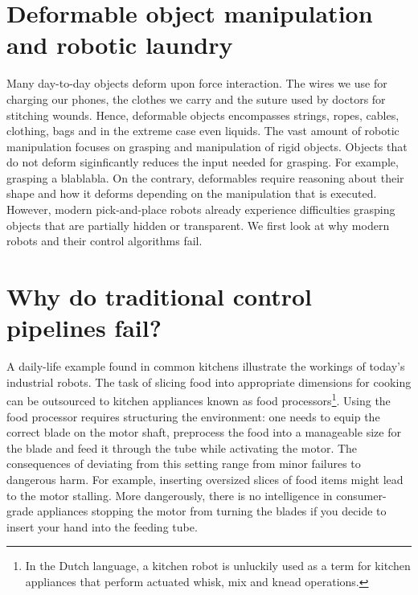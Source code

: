 \documentclass[\home/main.tex]{subfiles}
\begin{document}
\section{Deformable object manipulation and robotic laundry}
Many day-to-day objects deform upon force interaction. The wires we use for charging our phones, the clothes we carry and the suture used by doctors for stitching wounds. Hence, deformable objects encompasses strings, ropes, cables, clothing, bags and in the extreme case even liquids.  
The vast amount of robotic manipulation focuses on grasping and manipulation of rigid objects. Objects that do not deform siginficantly reduces the input needed for grasping. For example, grasping a blablabla.
On the contrary, deformables require reasoning about their shape and how it deforms depending on the manipulation that is executed.  
However, modern pick-and-place robots already experience difficulties grasping objects that are partially hidden or transparent. We first look at why modern robots and their control algorithms fail. 

\section{Why do traditional control pipelines fail?}
A daily-life example found in common kitchens illustrate the workings of today's industrial robots. The task of slicing food into appropriate dimensions for cooking can be outsourced to kitchen appliances known as food processors\footnote{In the Dutch language, a kitchen robot is unluckily used as a term for kitchen appliances that perform actuated whisk, mix and knead operations.}. Using the food processor requires structuring the environment: one needs to equip the correct blade on the motor shaft, preprocess the food into a manageable size for the blade and feed it through the tube while activating the motor. The consequences of deviating from this setting range from minor failures to dangerous harm. For example, inserting oversized slices of food items might lead to the motor stalling. More dangerously, there is no intelligence in consumer-grade appliances stopping the motor from turning the blades if you decide to insert your hand into the feeding tube.  
\end{document}
